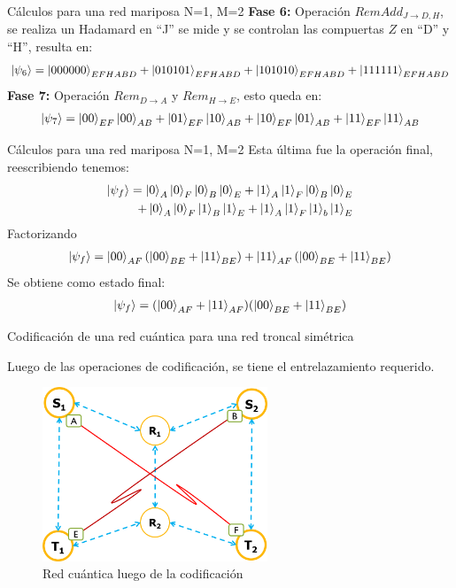 \documentclass[10pt]{beamer}
\renewenvironment{block}[1]
    {\begin{oldblock}{#1}
        \smallskip
    }
    {
    \end{oldblock}
    }
\begin{document}
\begin{frame}{Cálculos para una red mariposa N=1, M=2}
  \textbf{Fase 6:} Operación $RemAdd_{J \rightarrow D,H}$, se realiza un Hadamard en ``J'' se mide y se controlan las compuertas $Z$ en ``D'' y ``H'', resulta en:
  \begin{align*}
  \ket{\psi_6} = \ket{000000}_{EFHABD}+\ket{010101}_{EFHABD}+\ket{101010}_{EFHABD}+\ket{111111}_{EFHABD} 
  \end{align*}
  \textbf{Fase 7:} Operación  $ Rem_{D \rightarrow A} $ y  $ Rem_{H \rightarrow E} $, esto queda en:
  \begin{align*}
  \ket{\psi_7} = \ket{00}_{EF} \ket{00}_{AB} + \ket{01}_{EF} \ket{10}_{AB} + \ket{10}_{EF} \ket{01}_{AB} + \ket{11}_{EF} \ket{11}_{AB} 
  \end{align*}
\end{frame}

\begin{frame}{Cálculos para una red mariposa N=1, M=2}
  Esta última fue la operación final, reescribiendo tenemos:
  \begin{align*}
  \ket{\psi_{f}} =\ket{0}_{A} \ket{0}_{F} \ket{0}_{B}\ket{0}_{E} + \ket{1}_{A}
                  \ket{1}_{F}\ket{0}_{B}\ket{0}_{E} \\ 
                  +\ket{0}_{A} \ket{0}_{F} \ket{1}_{B}\ket{1}_{E} + \ket{1}_{A}
                  \ket{1}_{F}\ket{1}_{b}\ket{1}_{E}
  \end{align*}
  Factorizando
  \begin{align*}
  \ket{\psi_{f}} = \ket{00}_{AF}  (\ket{00}_{BE}+\ket{11}_{BE}) + \ket{11}_{AF}(\ket{00}_{BE}+\ket{11}_{BE})
  \end{align*}
  Se obtiene como estado final:
  \begin{align*}
  \ket{\psi_f} = (\ket{00}_{AF}+\ket{11}_{AF})(\ket{00}_{BE}+\ket{11}_{BE})
  \end{align*}
\end{frame}
\begin{frame}{Codificación de una red cuántica para una red troncal simétrica}
  \begin{block}{}
    Luego de las operaciones de codificación, se tiene el entrelazamiento requerido.
    \begin{figure}
      \includegraphics[width=0.6\textwidth]{butterflycoded2.png}
      \caption{Red cuántica luego de la codificación}
    \end{figure}
  \end{block}
\end{frame}
\end{document}
